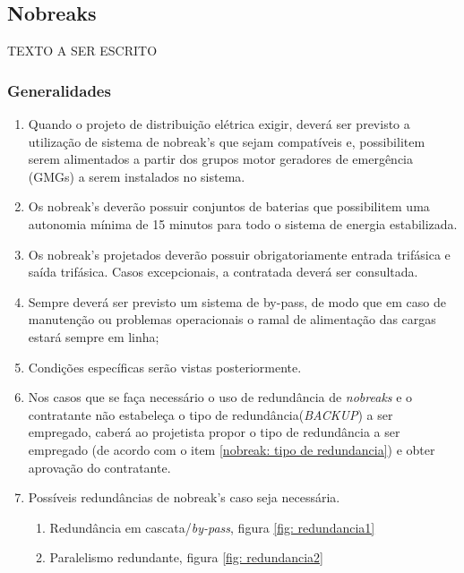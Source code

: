 \subsection{Nobreaks} \label{section: nobreak}
TEXTO A SER ESCRITO

\subsubsection{Generalidades}
\begin{enumerate}
	\item Quando o projeto de distribuição elétrica exigir, deverá ser previsto a utilização de sistema de nobreak’s que sejam compatíveis e, possibilitem serem alimentados a partir dos grupos motor geradores de emergência (GMGs) a serem instalados no sistema. 
	
	\item Os nobreak’s deverão possuir conjuntos de baterias que possibilitem uma autonomia mínima de 15 minutos para todo o sistema de energia estabilizada.
	
	\item Os nobreak’s projetados deverão possuir obrigatoriamente entrada trifásica e saída trifásica. Casos excepcionais, a contratada deverá ser consultada.
	
	\item Sempre deverá ser previsto um sistema de by-pass, de modo que em caso de manutenção ou problemas operacionais o ramal de alimentação das cargas estará sempre em linha;
	
	\item Condições específicas serão vistas posteriormente.
	
	\item Nos casos que se faça necessário o uso de redundância de \textit{nobreaks} e o contratante não estabeleça o tipo de redundância(\textit{BACKUP}) a ser empregado, caberá ao projetista propor o tipo de redundância a ser empregado (de acordo com o item \ref{nobreak: tipo de redundancia}) e obter aprovação do contratante.
	
	\item Possíveis redundâncias de nobreak's caso seja necessária.
	\begin{enumerate}\label{nobreak: tipo de redundancia}
		\item Redundância em cascata/\textit{by-pass}, figura \ref{fig: redundancia1}
		
		\item Paralelismo redundante, figura  \ref{fig: redundancia2}
		

\end{enumerate}
\end{enumerate}
